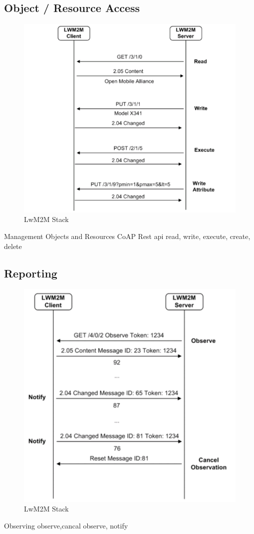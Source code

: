 \subsection{Object / Resource Access}
\begin{figure}[H]
\includegraphics[scale=0.5]{images/lwm2m/command_diagram.png}
\caption{LwM2M Stack\cite{LwM2MInterfaces}}
\end{figure}

Management Objects and Resources
CoAP Rest api
read, write, execute, create, delete

\subsection{Reporting}

\begin{figure}[H]
\includegraphics[scale=0.5]{images/lwm2m/report_diagram.png}
\caption{LwM2M Stack\cite{LwM2MInterfaces}}
\end{figure}
Observing
observe,cancal observe,  notify
